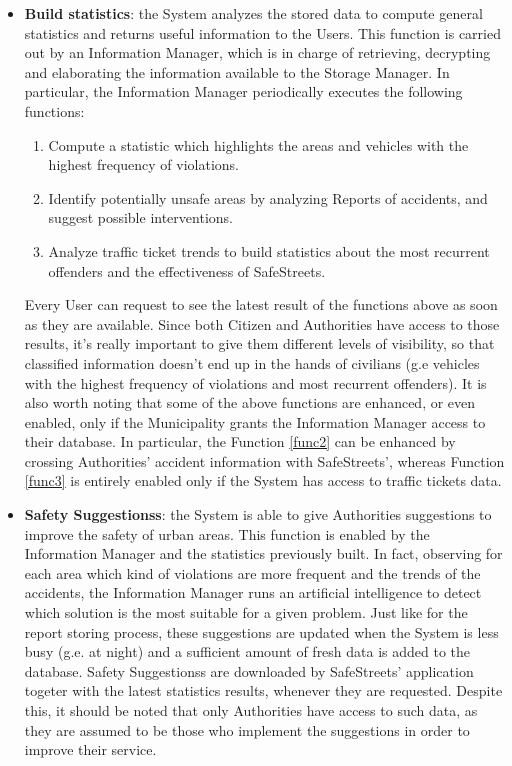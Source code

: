 \documentclass{report}
\begin{document}
\begin{itemize}
	\item \textbf{Build statistics}: the System analyzes the stored data to compute general statistics and returns useful information to the Users. This function is carried out by an Information Manager, which is in charge of retrieving, decrypting and elaborating the information available to the Storage Manager. In particular, the Information Manager periodically executes the following functions:
	\begin{enumerate}
		\item Compute a statistic which highlights the areas and vehicles with the highest frequency of violations.
		\item \label{func2} Identify potentially unsafe areas by analyzing Reports of accidents, and suggest possible interventions.
		\item \label{func3} Analyze traffic ticket trends to build statistics about the most recurrent offenders and the effectiveness of SafeStreets.
	\end{enumerate}
	Every User can request to see the latest result of the functions above as soon as they are available. Since both Citizen and Authorities have access to those results, it's really important to give them different levels of visibility, so that classified information doesn't end up in the hands of civilians (g.e vehicles with the highest frequency of violations and most recurrent offenders). It is also worth noting that some of the above functions are enhanced, or even enabled, only if the Municipality grants the Information Manager access to their database. In particular, the Function \ref{func2} can be enhanced by crossing Authorities' accident information with SafeStreets', whereas Function \ref{func3} is entirely enabled only if the System has access to traffic tickets data.

	\item \textbf{Safety Suggestionss}: the System is able to give Authorities suggestions to improve the safety of urban areas. This function is enabled by the Information Manager and the statistics previously built. In fact, observing for each area which kind of violations are more frequent and the trends of the accidents, the Information Manager runs an artificial intelligence to detect which solution is the most suitable for a given problem. Just like for the report storing process, these suggestions are updated when the System is less busy (g.e. at night) and a sufficient amount of fresh data is added to the database. Safety Suggestionss are downloaded by SafeStreets' application togeter with the latest statistics results, whenever they are requested. Despite this, it should be noted that only Authorities have access to such data, as they are assumed to be those who implement the suggestions in order to improve their service.
\end{itemize}
\end{document}
